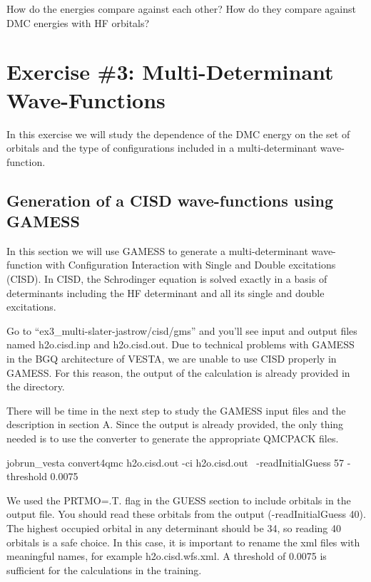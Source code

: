 How do the energies compare against each other? How do they compare against DMC
energies with HF orbitals?
\section{Exercise \#3: Multi-Determinant Wave-Functions}
In this exercise we will study the dependence of the DMC energy on the set of orbitals
and the type of configurations included in a multi-determinant wave-function. 

\subsection{Generation of a CISD wave-functions using GAMESS}
In this section we will use GAMESS to generate a multi-determinant wave-function with
Configuration Interaction with Single and Double excitations (CISD). In CISD, the Schrodinger equation is solved exactly in a basis of determinants 
including the HF determinant and all its single and double excitations. 

Go to ``ex3\_multi-slater-jastrow/cisd/gms'' and you'll see input and output files named h2o.cisd.inp and h2o.cisd.out. Due to technical problems with GAMESS in the BGQ architecture of VESTA, we are unable to use CISD properly in GAMESS. For this reason, the output of the calculation is  already provided in the directory. 


There will be time in the next step to study the GAMESS input
files and the description in section A. %
Since the output is already provided, the
only thing needed is to use the converter to generate the appropriate QMCPACK files.  %
\begin{shade}
jobrun_vesta convert4qmc h2o.cisd.out -ci h2o.cisd.out \
-readInitialGuess 57 -threshold 0.0075
\end{shade}

We used the PRTMO=.T. flag in the GUESS section to include orbitals in the output file. You should read these orbitals from the output (-readInitialGuess 40).
The highest occupied orbital in any determinant should be 34, so reading 40 orbitals is a safe choice. In this case, it is important to rename the xml files with meaningful names, for example h2o.cisd.wfs.xml. A threshold of 0.0075 is sufficient for the calculations in the training.


